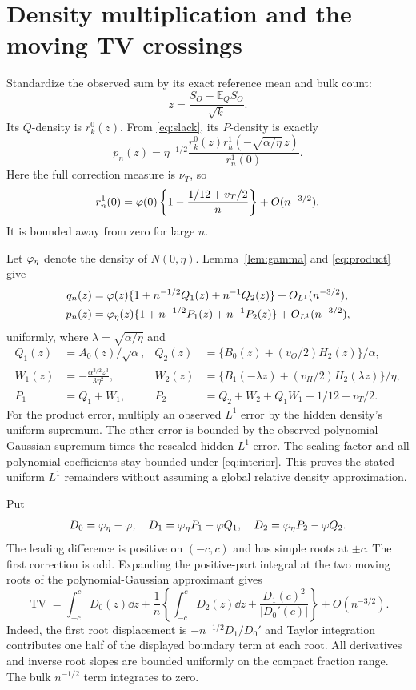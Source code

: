 \documentclass[11pt,a4paper]{article}
\theoremstyle{remark}\newtheorem*{ednote}{Editorial note (ProveIt, 2026-10-01)}
\newcommand{\E}{\mathbb E}\newcommand{\R}{\mathbb R}\newcommand{\TV}{\operatorname{TV}}
\begin{document}
\section{Density multiplication and the moving TV crossings}
Standardize the observed sum by its exact reference mean and bulk count:
\[
 z=\frac{S_O-\E_Q S_O}{\sqrt k}.
\]
Its $Q$-density is $r_k^0(z)$. From \eqref{eq:slack}, its $P$-density is exactly
\begin{equation}\label{eq:product}
 p_n(z)=\eta^{-1/2}
 \frac{r_k^0(z)r_h^1(-\sqrt{\alpha/\eta}\,z)}{r_n^1(0)}.
\end{equation}
Here the full correction measure is $\nu_T$, so
\begin{equation}\label{eq:denom}
 r_n^1(0)=\varphi(0)\left\{1-\frac{1/12+v_T/2}{n}\right\}+O(n^{-3/2}).
\end{equation}
It is bounded away from zero for large $n$.

Let $\varphi_\eta$ denote the density of $N(0,\eta)$. Lemma~\ref{lem:gamma} and \eqref{eq:product} give
\begin{align}
 q_n(z)&=\varphi(z)\{1+n^{-1/2}Q_1(z)+n^{-1}Q_2(z)\}
                        +O_{L^1}(n^{-3/2}),\label{eq:Qexp}\\
 p_n(z)&=\varphi_\eta(z)\{1+n^{-1/2}P_1(z)+n^{-1}P_2(z)\}
                        +O_{L^1}(n^{-3/2}),\label{eq:Pexp}
\end{align}
uniformly, where $\lambda=\sqrt{\alpha/\eta}$ and
\begin{align*}
 Q_1(z)&=A_0(z)/\sqrt\alpha,&
 Q_2(z)&=\{B_0(z)+(v_O/2)H_2(z)\}/\alpha,\\
 W_1(z)&=-\frac{\alpha^{3/2}z^3}{3\eta^2},&
 W_2(z)&=\{B_1(-\lambda z)+(v_H/2)H_2(\lambda z)\}/\eta,\\
 P_1&=Q_1+W_1,&P_2&=Q_2+W_2+Q_1W_1+1/12+v_T/2.
\end{align*}
For the product error, multiply an observed $L^1$ error by the hidden density's uniform supremum. The other error is bounded by the observed polynomial-Gaussian supremum times the rescaled hidden $L^1$ error. The scaling factor and all polynomial coefficients stay bounded under \eqref{eq:interior}. This proves the stated uniform $L^1$ remainders without assuming a global relative density approximation.

Put
\[
 D_0=\varphi_\eta-\varphi,\quad D_1=\varphi_\eta P_1-\varphi Q_1,
 \quad D_2=\varphi_\eta P_2-\varphi Q_2.
\]
The leading difference is positive on $(-c,c)$ and has simple roots at $\pm c$. The first correction is odd. Expanding the positive-part integral at the two moving roots of the polynomial-Gaussian approximant gives
\begin{equation}\label{eq:boundary}
 \TV=\int_{-c}^cD_0(z)\dd z+\frac1n
 \left\{\int_{-c}^cD_2(z)\dd z+
                   \frac{D_1(c)^2}{|D_0'(c)|}\right\}+O(n^{-3/2}).
\end{equation}
Indeed, the first root displacement is $-n^{-1/2}D_1/D_0'$ and Taylor integration contributes one half of the displayed boundary term at each root. All derivatives and inverse root slopes are bounded uniformly on the compact fraction range. The bulk $n^{-1/2}$ term integrates to zero.
\end{document}
